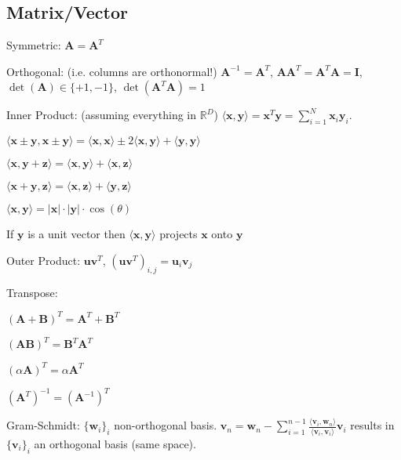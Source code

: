 \documentclass[a4paper, 11pt, landscape]{article}
\begin{document}
\begin{multicols*}{3}
\section{Matrix/Vector}
\begin{compactdesc}
	\item[Symmetric:] $\mathbf{A} = \mathbf{A}^T$
	\item[Orthogonal:] (i.e. columns are orthonormal!) $\mathbf{A}^{-1} = \mathbf{A}^T$, $\mathbf{A} \mathbf{A}^T = \mathbf{A}^T \mathbf{A} = \mathbf{I}$, $\operatorname{det}(\mathbf{A}) \in \{+1, -1\}$, $\operatorname{det}(\mathbf{A}^T \mathbf{A}) = 1$
	\item[Inner Product:] (assuming everything in $\mathbb{R}^D$) $\langle \mathbf{x}, \mathbf{y} \rangle = \mathbf{x}^T \mathbf{y} = \sum_{i=1}^{N} \mathbf{x}_i \mathbf{y}_i$.
	\begin{compactitem}
		\item $\langle \mathbf{x} \pm \mathbf{y}, \mathbf{x} \pm \mathbf{y} \rangle = \langle \mathbf{x}, \mathbf{x} \rangle \pm 2 \langle \mathbf{x}, \mathbf{y} \rangle + \langle \mathbf{y}, \mathbf{y} \rangle$
		\begin{listcols}
			\item $\langle \mathbf{x}, \mathbf{y} + \mathbf{z} \rangle = \langle \mathbf{x}, \mathbf{y} \rangle + \langle \mathbf{x}, \mathbf{z} \rangle$
			\item $\langle \mathbf{x} + \mathbf{y}, \mathbf{z} \rangle = \langle \mathbf{x}, \mathbf{z} \rangle + \langle \mathbf{y}, \mathbf{z} \rangle$
			\item $\langle \mathbf{x}, \mathbf{y} \rangle = |\mathbf{x}| \cdot |\mathbf{y}| \cdot \cos(\theta)$
		\end{listcols}
		\item If $\mathbf{y}$ is a unit vector then $\langle \mathbf{x}, \mathbf{y} \rangle$ projects $\mathbf{x}$ onto $\mathbf{y}$
	\end{compactitem}
	\item[Outer Product:] $\mathbf{u} \mathbf{v}^T$, $(\mathbf{u} \mathbf{v}^T)_{i, j} = \mathbf{u}_i \mathbf{v}_j$
	\item[Transpose:]\hfill
	\begin{listcols}
		\begin{compactitem}
			\item $(\mathbf{A} + \mathbf{B})^T = \mathbf{A}^T + \mathbf{B}^T$
			\item $(\mathbf{A}\mathbf{B})^T = \mathbf{B}^T \mathbf{A}^T$
			\item $(\alpha \mathbf{A})^T = \alpha \mathbf{A}^T$
			\item $(\mathbf{A}^T)^{-1} = (\mathbf{A}^{-1})^T$
		\end{compactitem}
	\end{listcols}
	\item[Gram-Schmidt:] $\{\mathbf{w}_i\}_i$ non-orthogonal basis. $\mathbf{v}_n = \mathbf{w}_n - \sum_{i=1}^{n-1} \frac{\langle \mathbf{v}_i, \mathbf{w}_n \rangle}{\langle \mathbf{v}_i, \mathbf{v}_i \rangle} \mathbf{v}_i$ results in $\{\mathbf{v}_i\}_i$ an orthogonal basis (same space).
\end{compactdesc}


\end{multicols*}
\end{document}
